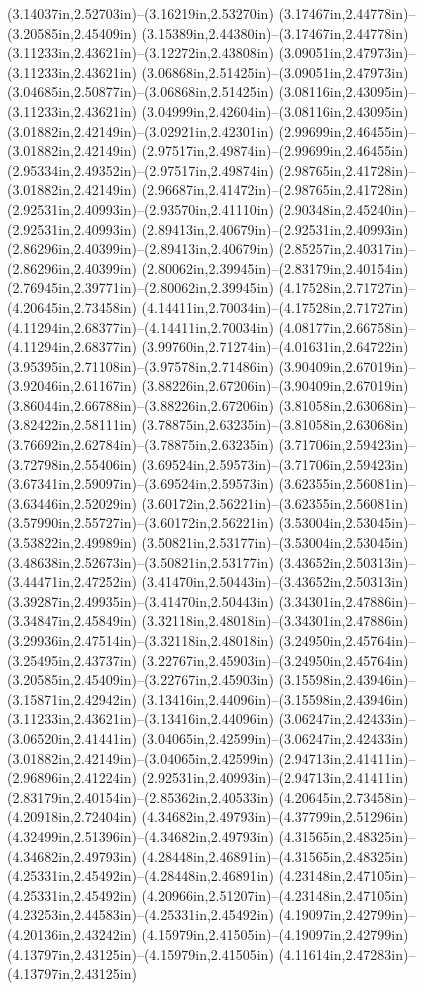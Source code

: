 (3.14037in,2.52703in)--(3.16219in,2.53270in) (3.17467in,2.44778in)--(3.20585in,2.45409in) (3.15389in,2.44380in)--(3.17467in,2.44778in) (3.11233in,2.43621in)--(3.12272in,2.43808in) (3.09051in,2.47973in)--(3.11233in,2.43621in) (3.06868in,2.51425in)--(3.09051in,2.47973in) (3.04685in,2.50877in)--(3.06868in,2.51425in) (3.08116in,2.43095in)--(3.11233in,2.43621in) (3.04999in,2.42604in)--(3.08116in,2.43095in) (3.01882in,2.42149in)--(3.02921in,2.42301in) (2.99699in,2.46455in)--(3.01882in,2.42149in) (2.97517in,2.49874in)--(2.99699in,2.46455in) (2.95334in,2.49352in)--(2.97517in,2.49874in) (2.98765in,2.41728in)--(3.01882in,2.42149in) (2.96687in,2.41472in)--(2.98765in,2.41728in) (2.92531in,2.40993in)--(2.93570in,2.41110in) (2.90348in,2.45240in)--(2.92531in,2.40993in) (2.89413in,2.40679in)--(2.92531in,2.40993in) (2.86296in,2.40399in)--(2.89413in,2.40679in) (2.85257in,2.40317in)--(2.86296in,2.40399in) (2.80062in,2.39945in)--(2.83179in,2.40154in) (2.76945in,2.39771in)--(2.80062in,2.39945in) (4.17528in,2.71727in)--(4.20645in,2.73458in) (4.14411in,2.70034in)--(4.17528in,2.71727in) (4.11294in,2.68377in)--(4.14411in,2.70034in) (4.08177in,2.66758in)--(4.11294in,2.68377in) (3.99760in,2.71274in)--(4.01631in,2.64722in) (3.95395in,2.71108in)--(3.97578in,2.71486in) (3.90409in,2.67019in)--(3.92046in,2.61167in) (3.88226in,2.67206in)--(3.90409in,2.67019in) (3.86044in,2.66788in)--(3.88226in,2.67206in) (3.81058in,2.63068in)--(3.82422in,2.58111in) (3.78875in,2.63235in)--(3.81058in,2.63068in) (3.76692in,2.62784in)--(3.78875in,2.63235in) (3.71706in,2.59423in)--(3.72798in,2.55406in) (3.69524in,2.59573in)--(3.71706in,2.59423in) (3.67341in,2.59097in)--(3.69524in,2.59573in) (3.62355in,2.56081in)--(3.63446in,2.52029in) (3.60172in,2.56221in)--(3.62355in,2.56081in) (3.57990in,2.55727in)--(3.60172in,2.56221in) (3.53004in,2.53045in)--(3.53822in,2.49989in) (3.50821in,2.53177in)--(3.53004in,2.53045in) (3.48638in,2.52673in)--(3.50821in,2.53177in) (3.43652in,2.50313in)--(3.44471in,2.47252in) (3.41470in,2.50443in)--(3.43652in,2.50313in) (3.39287in,2.49935in)--(3.41470in,2.50443in) (3.34301in,2.47886in)--(3.34847in,2.45849in) (3.32118in,2.48018in)--(3.34301in,2.47886in) (3.29936in,2.47514in)--(3.32118in,2.48018in) (3.24950in,2.45764in)--(3.25495in,2.43737in) (3.22767in,2.45903in)--(3.24950in,2.45764in) (3.20585in,2.45409in)--(3.22767in,2.45903in) (3.15598in,2.43946in)--(3.15871in,2.42942in) (3.13416in,2.44096in)--(3.15598in,2.43946in) (3.11233in,2.43621in)--(3.13416in,2.44096in) (3.06247in,2.42433in)--(3.06520in,2.41441in) (3.04065in,2.42599in)--(3.06247in,2.42433in) (3.01882in,2.42149in)--(3.04065in,2.42599in) (2.94713in,2.41411in)--(2.96896in,2.41224in) (2.92531in,2.40993in)--(2.94713in,2.41411in) (2.83179in,2.40154in)--(2.85362in,2.40533in) (4.20645in,2.73458in)--(4.20918in,2.72404in) (4.34682in,2.49793in)--(4.37799in,2.51296in) (4.32499in,2.51396in)--(4.34682in,2.49793in) (4.31565in,2.48325in)--(4.34682in,2.49793in) (4.28448in,2.46891in)--(4.31565in,2.48325in) (4.25331in,2.45492in)--(4.28448in,2.46891in) (4.23148in,2.47105in)--(4.25331in,2.45492in) (4.20966in,2.51207in)--(4.23148in,2.47105in) (4.23253in,2.44583in)--(4.25331in,2.45492in) (4.19097in,2.42799in)--(4.20136in,2.43242in) (4.15979in,2.41505in)--(4.19097in,2.42799in) (4.13797in,2.43125in)--(4.15979in,2.41505in) (4.11614in,2.47283in)--(4.13797in,2.43125in) 